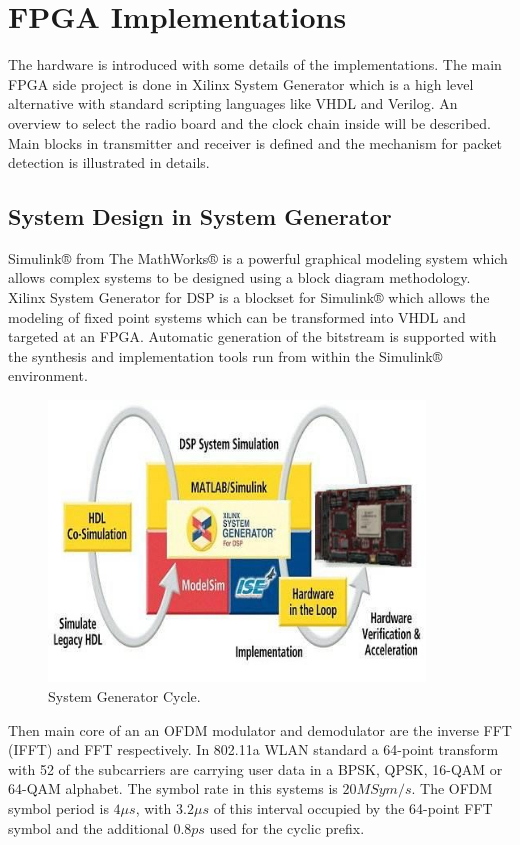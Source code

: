\chapter{FPGA Implementations}
\label{sec:chapter_3}

The hardware is introduced with some details of the implementations. The main FPGA side project is done in Xilinx System Generator which is a high level alternative with standard scripting languages like VHDL and Verilog. An overview to select the radio board and the clock chain inside will be described.\\
Main blocks in transmitter and receiver is defined and the mechanism for packet detection is illustrated in details.

\section{System Design in System Generator}
\label{sec_anasim}

Simulink® from The MathWorks® is a powerful graphical modeling system which allows complex systems to be designed using a block diagram methodology. Xilinx System Generator for DSP is a blockset for Simulink® which allows the modeling of fixed point systems which can be transformed into VHDL and targeted at an FPGA. Automatic generation of the bitstream is supported with the synthesis and implementation tools run from within the Simulink® environment.\\

\begin{figure}[h!]
\centering
\includegraphics[width=10cm]{content/fig/systemGen.JPG}
\caption{System Generator Cycle.}
\label{fig:systemGen}
\end{figure}

Then main core of an an OFDM modulator and demodulator are the inverse FFT (IFFT) and FFT respectively. In 802.11a WLAN standard a 64-point transform with 52 of the subcarriers are carrying user data in a BPSK,
QPSK, 16-QAM or 64-QAM alphabet. The symbol rate in this systems is $20 MSym/s$. The OFDM symbol period
is $4 \mu s$, with $3.2 \mu s$ of this interval occupied by the 64-point FFT symbol and the additional $0.8 ps$ used for the cyclic prefix.\\


